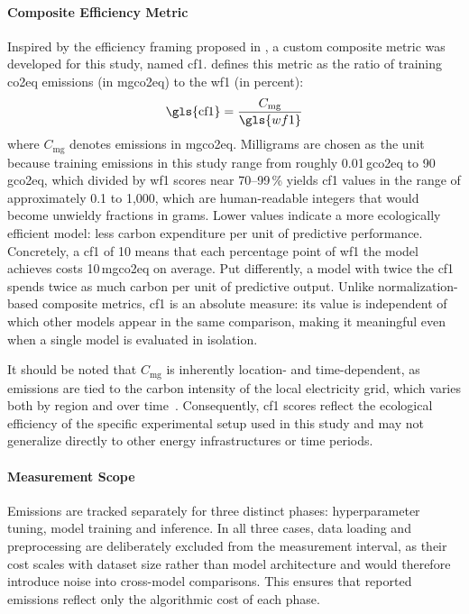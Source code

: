 \paragraph{Composite Efficiency Metric}
Inspired by the efficiency framing proposed in \citeauthor{schwartzGreenAI2020} \cite{schwartzGreenAI2020}, a custom composite metric was developed for this study, named \gls{cf1}.  defines this metric as the ratio of training \gls{co2eq} emissions (in \gls{mgco2eq}) to the \gls{wf1} (in percent):
\begin{equation}
\text{\gls{cf1}} = \frac{C_{\text{mg}}}{\gls{wf1}}
\label{eq:cf1}
\end{equation}
where $C_{\text{mg}}$ denotes emissions in \gls{mgco2eq}. Milligrams are chosen as the unit because training emissions in this study range from roughly 0.01\,\gls{gco2eq} to 90\,\gls{gco2eq}, which divided by \gls{wf1} scores near 70--99\,\% yields \gls{cf1} values in the range of approximately 0.1 to 1{,}000, which are human-readable integers that would become unwieldy fractions in grams. Lower values indicate a more ecologically efficient model: less carbon expenditure per unit of predictive performance. Concretely, a \gls{cf1} of 10 means that each percentage point of \gls{wf1} the model achieves costs 10\,\gls{mgco2eq} on average. Put differently, a model with twice the \gls{cf1} spends twice as much carbon per unit of predictive output. Unlike normalization-based composite metrics, \gls{cf1} is an absolute measure: its value is independent of which other models appear in the same comparison, making it meaningful even when a single model is evaluated in isolation.

It should be noted that $C_{\text{mg}}$ is inherently location- and time-dependent, as emissions are tied to the carbon intensity of the local electricity grid, which varies both by region and over time~\cite{wrightEfficiencyNotEnough2025}. Consequently, \gls{cf1} scores reflect the ecological efficiency of the specific experimental setup used in this study and may not generalize directly to other energy infrastructures or time periods.

\paragraph{Measurement Scope}
Emissions are tracked separately for three distinct phases: hyperparameter tuning, model training and inference. In all three cases, data loading and preprocessing are deliberately excluded from the measurement interval, as their cost scales with dataset size rather than model architecture and would therefore introduce noise into cross-model comparisons. This ensures that reported emissions reflect only the algorithmic cost of each phase.

